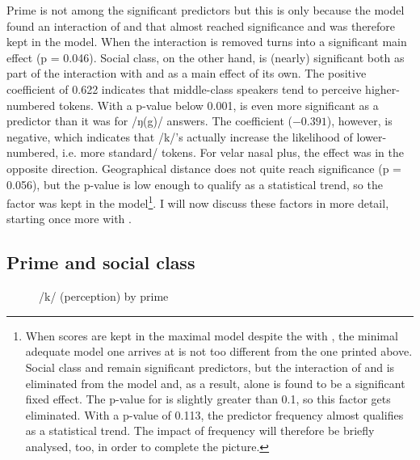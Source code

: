 Prime is not among the significant predictors but this is only because the model found an interaction of  and  that almost reached significance and was therefore kept in the model.
When the interaction is removed  turns into a significant main effect (p = 0.046).
Social class, on the other hand, is (nearly) significant both as part of the interaction with  and as a main effect of its own.
The positive coefficient of 0.622 indicates that middle-class speakers tend to perceive higher-numbered tokens.
With a p-value below 0.001,  is even more significant as a predictor than it was for /ŋ(g)/ answers.
The coefficient (\ensuremath{-0.391}), however, is negative, which indicates that  /k/'s actually increase the likelihood of lower-numbered, i.e. more standard/ tokens.
For velar nasal plus, the effect was in the opposite direction.
Geographical distance does not quite reach significance (p = 0.056), but the p-value is low enough to qualify as a statistical trend, so the factor was kept in the model\footnote{When  scores are kept in the maximal model despite the  with , the minimal adequate model one arrives at is not too different from the one printed above. Social class and  remain significant predictors, but the interaction of  and  is eliminated from the model and, as a result,  alone is found to be a significant fixed effect. The p-value for  is slightly greater than 0.1, so this factor gets eliminated. With a p-value of 0.113, the predictor frequency almost qualifies as a statistical trend. The impact of frequency will therefore be briefly analysed, too, in order to complete the picture.}.
I will now discuss these factors in more detail, starting once more with .

\subsection{Prime and social class}
\label{sec.perc_res.k.prime}

\begin{figure}[h]
	\centering
		\resizebox{.49\linewidth}{!}{} 
	\caption{/k/ (perception) by prime}
	\label{fig.bar.k.tot.ext}
\end{figure}

